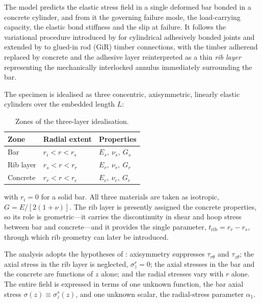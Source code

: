 The model predicts the elastic stress field in a single deformed bar bonded in a concrete cylinder, and from it the governing failure mode, the load-carrying capacity, the elastic bond stiffness and the slip at failure.
It follows the variational procedure introduced by
\textcite{nemesModelingCylindricalAdhesively2009} for cylindrical adhesively
bonded joints and extended by \textcite{alaviAnalyticalProcedureFailure2025}
to glued-in rod (GiR) timber connections, with the timber adherend replaced by
concrete and the adhesive layer reinterpreted as a thin \emph{rib layer}
representing the mechanically interlocked annulus immediately surrounding the
bar.

\noindent The specimen is idealised as three concentric, axisymmetric, linearly elastic
cylinders over the embedded length $L$:

\begin{table}[htbp]
\centering
\begin{tabular}{lll}
\hline
Zone & Radial extent & Properties \\
\hline
Bar       & $r_i < r < r_s$ & $E_s,\ \nu_s,\ G_s$ \\
Rib layer & $r_s < r < r_r$ & $E_r,\ \nu_r,\ G_r$ \\
Concrete  & $r_r < r < r_e$ & $E_c,\ \nu_c,\ G_c$ \\
\hline
\end{tabular}
\caption{Zones of the three-layer idealisation.}
\label{tab:zones}
\end{table}

\noindent with $r_i = 0$ for a solid bar. All three materials are taken as
isotropic, $G = E/[2(1+\nu)]$. The rib layer is presently assigned the concrete
properties, so its role is geometric---it carries the discontinuity in shear
and hoop stress between bar and concrete---and it provides the single
parameter, $t_{\mathrm{rib}} = r_r - r_s$, through which rib geometry can
later be introduced.

\noindent The analysis adopts the hypotheses of
\textcite{nemesModelingCylindricalAdhesively2009}: axisymmetry suppresses
$\tau_{r\theta}$ and $\tau_{z\theta}$; the axial stress in the rib layer is
neglected, $\sigma_z^{r} = 0$; the axial stresses in the bar and the concrete
are functions of $z$ alone; and the radial stresses vary with $r$ alone. The
entire field is expressed in terms of one unknown function, the bar axial
stress $\sigma(z) \equiv \sigma_z^{s}(z)$, and one unknown scalar, the
radial-stress parameter $\alpha_1$.

